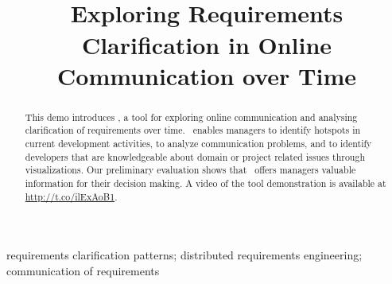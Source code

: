 
\title{\viss\\Exploring Requirements Clarification in Online Communication over Time}


\author{
}

\maketitle


\begin{abstract}
This demo introduces \viss, a tool for exploring online communication and analysing clarification of requirements over time.
\viss\ enables managers to identify hotspots in current development activities, to analyze communication problems, and to identify developers that are knowledgeable about domain or project related issues through visualizations.
Our preliminary evaluation shows that \viss\ offers managers valuable information for their decision making.
A video of the tool demonstration is available at \url{http://t.co/ilExAoB1}.
\end{abstract}

\begin{IEEEkeywords}
requirements clarification patterns; distributed requirements engineering; communication of requirements
\end{IEEEkeywords}
